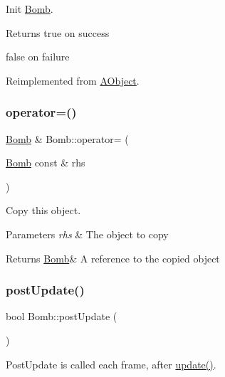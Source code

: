 Init \hyperlink{class_bomb}{Bomb}. 

\begin{DoxyReturn}{Returns}
true on success 

false on failure 
\end{DoxyReturn}


Reimplemented from \hyperlink{class_a_object_afa83ef1c900a47453524219788327b86}{A\+Object}.

\mbox{\label{class_bomb_a85eb751af149c92278eafdbabced0d3d}} 
\subsubsection{\texorpdfstring{operator=()}{operator=()}}
{\footnotesize\ttfamily \hyperlink{class_bomb}{Bomb} \& Bomb\+::operator= (\begin{DoxyParamCaption}\item[{\hyperlink{class_bomb}{Bomb} const \&}]{rhs }\end{DoxyParamCaption})}



Copy this object. 


\begin{DoxyParams}{Parameters}
{\em rhs} & The object to copy \\
\hline
\end{DoxyParams}
\begin{DoxyReturn}{Returns}
\hyperlink{class_bomb}{Bomb}\& A reference to the copied object 
\end{DoxyReturn}
\mbox{\label{class_bomb_a443c5d40a92e67ef456c71369e8a111b}} 
\subsubsection{\texorpdfstring{post\+Update()}{postUpdate()}}
{\footnotesize\ttfamily bool Bomb\+::post\+Update (\begin{DoxyParamCaption}{ }\end{DoxyParamCaption})\hspace{0.3cm}{\ttfamily [virtual]}}



Post\+Update is called each frame, after \hyperlink{class_bomb_a9808d8efcc57b9ce7b0bd48d95875aad}{update()}. 

